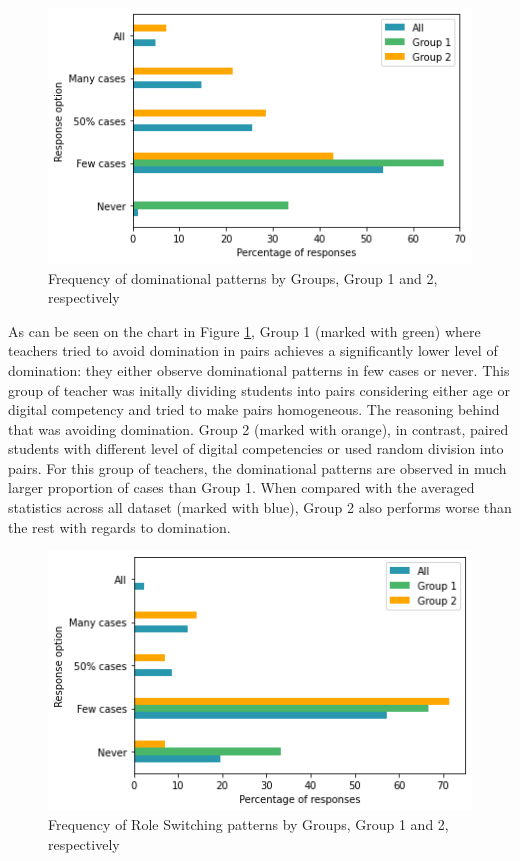 \documentclass[conference]{IEEEtran}
\begin{document}
\begin{figure}[h]
\includegraphics[scale=0.5]{images/domination-comparison.png}
\caption{Frequency of dominational patterns by Groups, Group 1 and 2, respectively}
\label{fig:dominationCompare}
\end{figure}

As can be seen on the chart in Figure \ref{fig:dominationCompare}, Group 1 (marked with green) where teachers tried to avoid domination in pairs achieves a significantly lower level of domination: they either observe dominational patterns in few cases or never. This group of teacher was initally dividing students into pairs considering either age or digital competency and tried to make pairs homogeneous. The reasoning behind that was avoiding domination. Group 2 (marked with orange), in contrast, paired students with different level of digital competencies or used random division into pairs. For this group of teachers, the dominational patterns are observed in much larger proportion of cases than Group 1. When compared with the averaged statistics across all dataset (marked with blue), Group 2 also performs worse than the rest with regards to domination. 

\begin{figure}[ht]
\includegraphics[scale=0.5]{role-switch-comparison.png}
\caption{Frequency of Role Switching patterns by Groups, Group 1 and 2, respectively}
\label{fig:roleSwitchCompare}
\end{figure}
\end{document}
